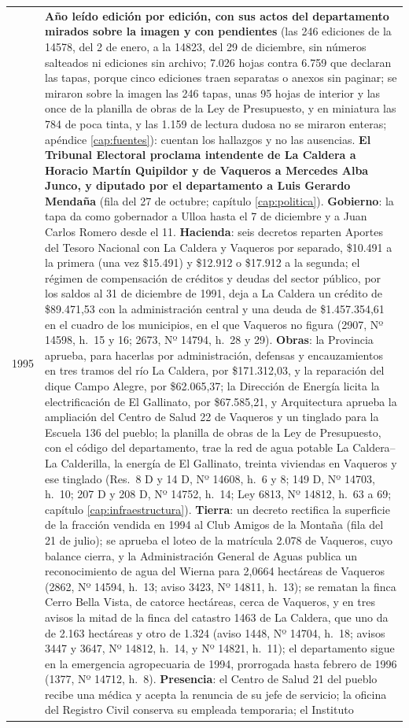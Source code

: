 \begin{longtable}{@{}p{2.7cm}p{10.3cm}@{}}
1995 & \textbf{Año leído edición por edición, con sus actos del departamento mirados sobre la imagen y con pendientes} (las 246 ediciones de la 14578, del 2 de enero, a la 14823, del 29 de diciembre, sin números salteados ni ediciones sin archivo; 7.026 hojas contra 6.759 que declaran las tapas, porque cinco ediciones traen separatas o anexos sin paginar; se miraron sobre la imagen las 246 tapas, unas 95 hojas de interior y las once de la planilla de obras de la Ley de Presupuesto, y en miniatura las 784 de poca tinta, y las 1.159 de lectura dudosa no se miraron enteras; apéndice \ref{cap:fuentes}): cuentan los hallazgos y no las ausencias. \textbf{El Tribunal Electoral proclama intendente de La Caldera a Horacio Martín Quipildor y de Vaqueros a Mercedes Alba Junco, y diputado por el departamento a Luis Gerardo Mendaña} (fila del 27 de octubre; capítulo \ref{cap:politica}). \textbf{Gobierno}: la tapa da como gobernador a Ulloa hasta el 7 de diciembre y a Juan Carlos Romero desde el 11. \textbf{Hacienda}: seis decretos reparten Aportes del Tesoro Nacional con La Caldera y Vaqueros por separado, \$10.491 a la primera (una vez \$15.491) y \$12.912 o \$17.912 a la segunda; el régimen de compensación de créditos y deudas del sector público, por los saldos al 31 de diciembre de 1991, deja a La Caldera un crédito de \$89.471,53 con la administración central y una deuda de \$1.457.354,61 en el cuadro de los municipios, en el que Vaqueros no figura (2907, Nº 14598, h.\ 15 y 16; 2673, Nº 14794, h.\ 28 y 29). \textbf{Obras}: la Provincia aprueba, para hacerlas por administración, defensas y encauzamientos en tres tramos del río La Caldera, por \$171.312,03, y la reparación del dique Campo Alegre, por \$62.065,37; la Dirección de Energía licita la electrificación de El Gallinato, por \$67.585,21, y Arquitectura aprueba la ampliación del Centro de Salud 22 de Vaqueros y un tinglado para la Escuela 136 del pueblo; la planilla de obras de la Ley de Presupuesto, con el código del departamento, trae la red de agua potable La Caldera--La Calderilla, la energía de El Gallinato, treinta viviendas en Vaqueros y ese tinglado (Res.\ 8 D y 14 D, Nº 14608, h.\ 6 y 8; 149 D, Nº 14703, h.\ 10; 207 D y 208 D, Nº 14752, h.\ 14; Ley 6813, Nº 14812, h.\ 63 a 69; capítulo \ref{cap:infraestructura}). \textbf{Tierra}: un decreto rectifica la superficie de la fracción vendida en 1994 al Club Amigos de la Montaña (fila del 21 de julio); se aprueba el loteo de la matrícula 2.078 de Vaqueros, cuyo balance cierra, y la Administración General de Aguas publica un reconocimiento de agua del Wierna para 2,0664 hectáreas de Vaqueros (2862, Nº 14594, h.\ 13; aviso 3423, Nº 14811, h.\ 13); se rematan la finca Cerro Bella Vista, de catorce hectáreas, cerca de Vaqueros, y en tres avisos la mitad de la finca del catastro 1463 de La Caldera, que uno da de 2.163 hectáreas y otro de 1.324 (aviso 1448, Nº 14704, h.\ 18; avisos 3447 y 3647, Nº 14812, h.\ 14, y Nº 14821, h.\ 11); el departamento sigue en la emergencia agropecuaria de 1994, prorrogada hasta febrero de 1996 (1377, Nº 14712, h.\ 8). \textbf{Presencia}: el Centro de Salud 21 del pueblo recibe una médica y acepta la renuncia de su jefe de servicio; la oficina del Registro Civil conserva su empleada temporaria; el Instituto 
\end{longtable}
